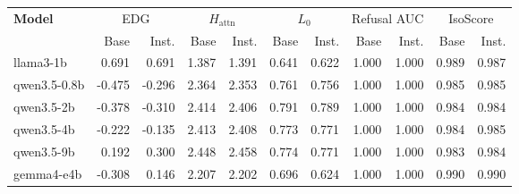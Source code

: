 \begin{tabular}{@{}lrrrrrrrrrr@{}}
\toprule
\textbf{Model} & \multicolumn{2}{c}{EDG} & \multicolumn{2}{c}{$H_{\text{attn}}$} & \multicolumn{2}{c}{$L_0$} & \multicolumn{2}{c}{Refusal AUC} & \multicolumn{2}{c}{IsoScore} \\
 & Base & Inst. & Base & Inst. & Base & Inst. & Base & Inst. & Base & Inst. \\
\midrule
llama3-1b & 0.691 & 0.691 & 1.387 & 1.391 & 0.641 & 0.622 & 1.000 & 1.000 & 0.989 & 0.987 \\
qwen3.5-0.8b & -0.475 & -0.296 & 2.364 & 2.353 & 0.761 & 0.756 & 1.000 & 1.000 & 0.985 & 0.985 \\
qwen3.5-2b & -0.378 & -0.310 & 2.414 & 2.406 & 0.791 & 0.789 & 1.000 & 1.000 & 0.984 & 0.984 \\
qwen3.5-4b & -0.222 & -0.135 & 2.413 & 2.408 & 0.773 & 0.771 & 1.000 & 1.000 & 0.984 & 0.985 \\
qwen3.5-9b & 0.192 & 0.300 & 2.448 & 2.458 & 0.774 & 0.771 & 1.000 & 1.000 & 0.983 & 0.984 \\
gemma4-e4b & -0.308 & 0.146 & 2.207 & 2.202 & 0.696 & 0.624 & 1.000 & 1.000 & 0.990 & 0.990 \\
\bottomrule
\end{tabular}